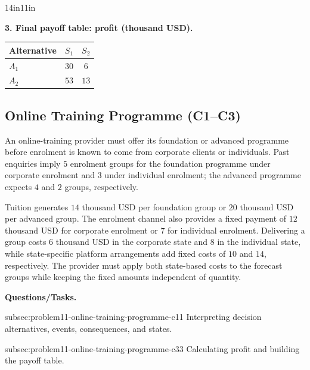 \begin{CalculationLandscape}{14in}{11in}
\noindent\begin{minipage}{\linewidth}
\textbf{3. Final payoff table: profit (thousand USD).}
\begin{center}
\begin{tabular}{@{}lcc@{}}
\toprule
Alternative & \(S_1\) & \(S_2\) \\
\midrule
\(A_1\) & \(30\) & \(6\) \\
\(A_2\) & \(53\) & \(13\) \\
\bottomrule
\end{tabular}
\end{center}
\end{minipage}



\end{CalculationLandscape}


	\subsection{Online Training Programme (C1--C3)}
	\label{sec:problem11-online-training-programme-c1-c3}

	An online-training provider must offer its foundation or advanced programme before enrolment is known to come from corporate clients or individuals. Past enquiries imply \(5\) enrolment groups for the foundation programme under corporate enrolment and \(3\) under individual enrolment; the advanced programme expects \(4\) and \(2\) groups, respectively.

	Tuition generates \(14\) thousand USD per foundation group or \(20\) thousand USD per advanced group. The enrolment channel also provides a fixed payment of \(12\) thousand USD for corporate enrolment or \(7\) for individual enrolment. Delivering a group costs \(6\) thousand USD in the corporate state and \(8\) in the individual state, while state-specific platform arrangements add fixed costs of \(10\) and \(14\), respectively. The provider must apply both state-based costs to the forecast groups while keeping the fixed amounts independent of quantity.

	\textbf{Questions/Tasks.}
	\begin{enumerate}
		\CriterionTask
		{subsec:problem11-online-training-programme-c1}{1}
		{Interpreting decision alternatives, events, consequences, and states.}

		\CriterionTask
		{subsec:problem11-online-training-programme-c3}{3}
		{Calculating profit and building the payoff table.}
	\end{enumerate}

